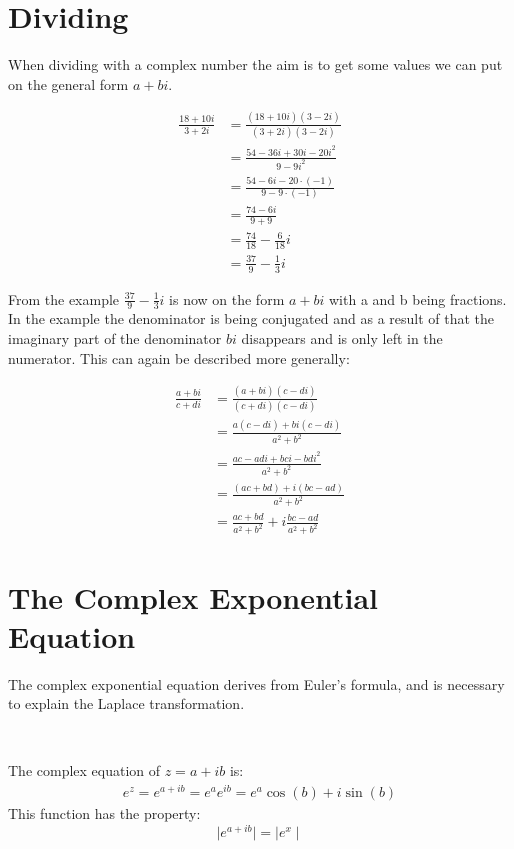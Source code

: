 \section{Dividing}
When dividing with a complex number the aim is to get some values we can put on the general form $a + bi$. 
\begin{definition}

\begin{align*}
\frac{18 + 10i}{3 + 2i} &= \frac{(18 + 10i)(3 - 2i)}{(3+2i)(3-2i)} \\[1em]
&= \frac{54 - 36i + 30i - 20i^2}{9 - 9i^2} \\[1em]
&= \frac{54 - 6i - 20 \cdot (-1)}{9 - 9 \cdot (-1)} \\[1em]
&= \frac{74 - 6i}{9 + 9} \\[1em]
&= \frac{74}{18} - \frac{6}{18}i \\[1em]
&= \frac{37}{9} - \frac{1}{3}i
\end{align*}
\end{definition}
From the example $\frac{37}{9} - \frac{1}{3}i$ is now on the form $a+bi$ with a and b being fractions. In the example the denominator is being conjugated and as a result of that the imaginary part of the denominator $bi$ disappears and is only left in the numerator. 
This can again be described more generally:
\begin{center}
\begin{align*}
\frac{a + bi}{c + di} 										
&= \frac{(a+bi)(c-di)}{(c+di)(c-di)} 						\\[1em]
&= \frac{a(c-di)+bi(c-di)}{a^2+b^2} 							\\[1em]
&= \frac{ac-adi+bci-bdi^2}{a^2+b^2}							\\[1em]
&= \frac{(ac+bd)+i(bc-ad)}{a^2+b^2}							\\[1em]
&= \frac{ac+bd}{a^2+b^2}+i \frac{bc-ad}{a^2+b^2}				
\end{align*}
\end{center}

\section{The Complex Exponential Equation}
The complex exponential equation derives from Euler’s formula, and is necessary to explain the Laplace transformation. \\

\begin{mdframed}[backgroundcolor = fersken,
  frametitle = The Complex Exponential, roundcorner=10pt]
\

 The complex equation of $z=a+ib$ is:
\begin{align}
e^z=e^{a+ib}=e^ae^{ib}=e^a\cos(b)+i\sin(b)
\end{align}
This function has the property:
$$\mid e^{a+ib} \mid = \mid e^x \mid$$
\end{mdframed}

